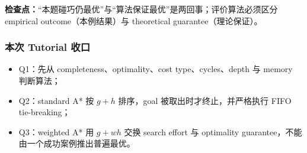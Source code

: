 \textbf{检查点：}“本题碰巧仍最优”与“算法保证最优”是两回事；评价算法必须区分 empirical outcome（本例结果）与 theoretical guarantee（理论保证）。

\subsubsection*{本次 Tutorial 收口}

\begin{itemize}
  \item Q1：先从 completeness、optimality、cost type、cycles、depth 与 memory 判断算法；
  \item Q2：standard A* 按 $g+h$ 排序，goal 被取出时才终止，并严格执行 FIFO tie-breaking；
  \item Q3：weighted A* 用 $g+wh$ 交换 search effort 与 optimality guarantee，不能由一个成功案例推出普遍最优。
\end{itemize}

